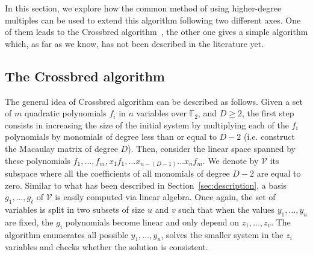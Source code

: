 \documentclass[a4paper,UKenglish,cleveref, autoref]{lipics-v2019}
\begin{document}
In this section, we explore how the common method of using higher-degree multiples can be used to extend this algorithm following two different axes.
%
One of them leads to the \textsf{Crossbred} algorithm~\cite{JouxV17}, the other
one gives a simple algorithm which, as far as we know, has not been described
in the literature yet.


\subsection{The \textsf{Crossbred} algorithm}\label{sec:JV}

The general idea of \textsf{Crossbred} algorithm can be described as follows.
Given a set of $m$ quadratic polynomials $f_i$ in $n$ variables over $\mathbb{F}_2$, 
and $D \geq 2$, the first step consists in
increasing the size of the initial system by multiplying each of the $f_i$
polynomials by monomials of degree less than or equal to $D-2$ 
(i.e. construct the Macaulay matrix of degree $D$).
Then, consider the linear space spanned 
by these polynomials $f_1, \dots, f_m, x_1f_1, \dots x_{n-(D-1)}\dots x_{n}f_m$. 
We denote by $\mathcal{V}$ its subspace where all the coefficients of all 
monomials of degree $D -2$ are equal to zero. Similar to what has been 
described in Section~\ref{sec:description}, a basis $g_1, \dots, g_\ell$ of
$\mathcal{V}$ is easily computed via linear algebra. Once again, the set of variables
is split in two subsets of size $u$ and $v$ such that when the values $y_1, \dots, y_u$
are fixed, the $g_i$ polynomials become linear and only depend on $z_1, \dots, z_v$.
The algorithm enumerates all possible $y_1, \dots, y_u$, solves the smaller system in the $z_i$
variables and checks whether the solution is consistent.
\end{document}
